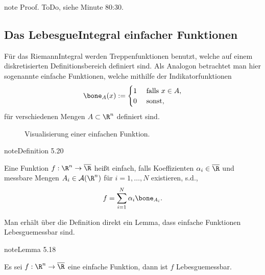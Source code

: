 \documentclass[letterpaper,10pt,german]{jupyterBook}
\let\sphinxpxdimen\pdfpxdimen\else\newdimen\sphinxpxdimen
\begin{document}
\begin{sphinxadmonition}{note}
\sphinxAtStartPar
Proof. ToDo, siehe  Minute 80:30.
\end{sphinxadmonition}


\subsection{Das Lebesgue\sphinxhyphen{}Integral einfacher Funktionen}
\label{\detokenize{masstheorie/lebesgue_integral:das-lebesgue-integral-einfacher-funktionen}}
\sphinxAtStartPar
Für das Riemann\sphinxhyphen{}Integral werden Treppenfunktionen benutzt, welche auf einem diskretisierten Definitionsbereich definiert sind. Als Analogon betrachtet man hier sogenannte einfache Funktionen, welche mithilfe der Indikatorfunktionen
\begin{equation*}
\begin{split}\bone_A(x):=
\begin{cases}
1&\text{ falls }x\in A,\\
0&\text{ sonst,}
\end{cases}\end{split}
\end{equation*}
\sphinxAtStartPar
für verschiedenen Mengen \(A\subset \R^n\) definiert sind.

\begin{figure}[htbp]
\centering
\capstart

\noindent\sphinxincludegraphics[width=400\sphinxpxdimen]{{simplefun}.jpg}
\caption{Visualisierung einer einfachen Funktion.}\label{\detokenize{masstheorie/lebesgue_integral:fig-simplefun}}\end{figure}
\label{masstheorie/lebesgue_integral:definition-8}
\begin{sphinxadmonition}{note}{Definition 5.20}



\sphinxAtStartPar
Eine Funktion \(f:\R^n\to\overline{\R}\) heißt einfach, falls Koeffizienten \(\alpha_i\in\overline{\R}\) und messbare Mengen \(A_i\in\mathcal{A}(\R^n)\) für \(i=1,\ldots,N\) existieren, s.d.,
\begin{equation*}
\begin{split}f = \sum_{i=1}^N \alpha_i \bone_{A_i}.\end{split}
\end{equation*}\end{sphinxadmonition}

\sphinxAtStartPar
Man erhält über die Definition direkt ein Lemma, dass einfache Funktionen Lebesgue\sphinxhyphen{}messbar sind.
\label{masstheorie/lebesgue_integral:lemma-9}
\begin{sphinxadmonition}{note}{Lemma 5.18}



\sphinxAtStartPar
Es sei \(f:\R^n\to\overline{\R}\) eine einfache Funktion, dann ist \(f\) Lebesgue\sphinxhyphen{}messbar.
\end{sphinxadmonition}
\end{document}
